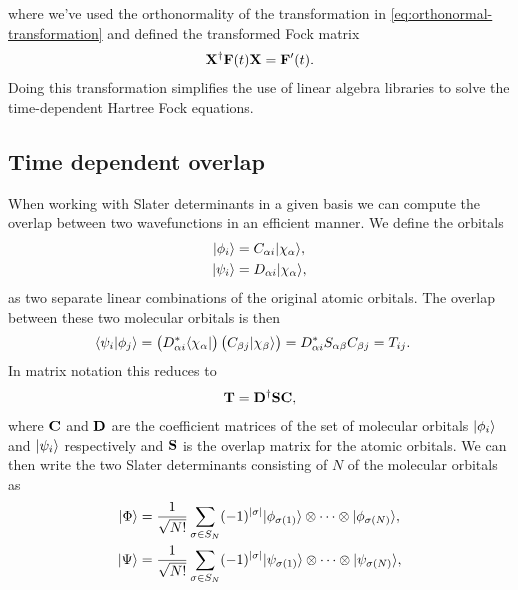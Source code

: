         where we've used the orthonormality of the transformation in
        \autoref{eq:orthonormal-transformation} and defined the transformed Fock
        matrix
        \begin{align}
            \mathbf{X}^{\dagger}\mathbf{F}(t)\mathbf{X} = \mathbf{F}'(t).
        \end{align}
        Doing this transformation simplifies the use of linear algebra libraries
        to solve the time-dependent Hartree Fock equations.

    \subsection{Time dependent overlap}
        When working with Slater determinants in a given basis we can compute
        the overlap between two wavefunctions in an efficient manner. We define
        the orbitals
        \begin{align}
            | \phi_i \rangle &= C_{\alpha i}| \chi_{\alpha} \rangle, \\
            | \psi_i \rangle &= D_{\alpha i}| \chi_{\alpha} \rangle,
        \end{align}
        as two separate linear combinations of the original atomic orbitals. The
        overlap between these two molecular orbitals is then
        \begin{align}
            \langle \psi_i | \phi_j \rangle
            &= \left( 
                D_{\alpha i}^{*}
                \langle \chi_{\alpha} |
             \right)\left( 
                C_{\beta j}
                | \chi_{\beta} \rangle
             \right)
            = D_{\alpha i}^{*}S_{\alpha\beta} C_{\beta j}
            = T_{ij}.
        \end{align}
        In matrix notation this reduces to
        \begin{align}
            \mathbf{T} = \mathbf{D}^{\dagger}\mathbf{S}\mathbf{C},
        \end{align}
        where $\mathbf{C}$ and $\mathbf{D}$ are the coefficient matrices of the set of
        molecular orbitals $| \phi_i \rangle$ and $| \psi_i \rangle$ respectively and
        $\mathbf{S}$ is the overlap matrix for the atomic orbitals.  We can then
        write the two Slater determinants consisting of $N$ of the molecular
        orbitals as
        \begin{align}
            | \Phi \rangle &= \frac{1}{\sqrt{N!}}
            \sum_{\sigma \in S_N}(-1)^{|\sigma|}
            | \phi_{\sigma(1)} \rangle
            \otimes\dots\otimes
            | \phi_{\sigma(N)} \rangle, \\
            | \Psi \rangle &= \frac{1}{\sqrt{N!}}
            \sum_{\sigma \in S_N}(-1)^{|\sigma|}
            | \psi_{\sigma(1)} \rangle
            \otimes\dots\otimes
            | \psi_{\sigma(N)} \rangle,
        \end{align}
